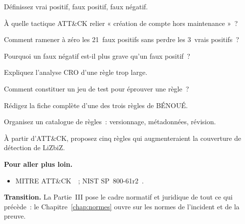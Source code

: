 \begin{boxexo}[title={\ding{45}\quad Exercice~7.2. Trois cas \niveaubase}]
Définissez vrai positif, faux positif, faux négatif.
\end{boxexo}

\begin{boxexo}[title={\ding{45}\quad Exercice~7.3. Technique \niveaubase}]
À quelle tactique ATT\&CK relier « création de compte hors maintenance »~?
\end{boxexo}

\begin{boxexo}[title={\ding{45}\quad Exercice~7.4. Affiner \niveaumoyen}]
Comment ramener à zéro les 21~faux positifs sans perdre les 3~vrais positifs~?
\end{boxexo}

\begin{boxexo}[title={\ding{45}\quad Exercice~7.5. Faux négatif \niveaumoyen}]
Pourquoi un faux négatif est-il plus grave qu'un faux positif~?
\end{boxexo}

\begin{boxexo}[title={\ding{45}\quad Exercice~7.6. CRO \niveaumoyen}]
Expliquez l'analyse CRO d'une règle trop large.
\end{boxexo}

\begin{boxexo}[title={\ding{45}\quad Exercice~7.7. Jeu de test \niveaumoyen}]
Comment constituer un jeu de test pour éprouver une règle~?
\end{boxexo}

\begin{boxexo}[title={\ding{45}\quad Exercice~7.8. Fiche de règle \niveaumoyen}]
Rédigez la fiche complète d'une des trois règles de BÉNOUÉ.
\end{boxexo}

\begin{boxexo}[title={\ding{45}\quad Exercice~7.9. Catalogue \niveauexpert}]
Organisez un catalogue de règles~: versionnage, métadonnées, révision.
\end{boxexo}

\begin{boxexo}[title={\ding{45}\quad Exercice~7.10. Couverture \niveauexpert}]
À partir d'ATT\&CK, proposez cinq règles qui augmenteraient la couverture de
détection de LiZbiZ.
\end{boxexo}

\bigskip

\begin{boxinfo}
\textbf{Pour aller plus loin.}
\begin{itemize}
    \item MITRE ATT\&CK~\cite{mitreattack}~; NIST SP~800-61r2~\cite{nist80061r2}.
\end{itemize}
\end{boxinfo}

\begin{boxinfo}
\textbf{Transition.} La Partie~III pose le cadre normatif et juridique de
tout ce qui précède~: le Chapitre~\ref{chap:normes} ouvre sur les normes de
l'incident et de la preuve.
\end{boxinfo}
